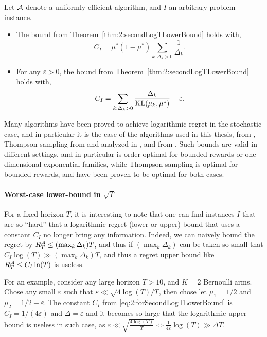 \begin{theorem}\label{thm:2:forSecondLogTLowerBound}
    Let $\mathcal{A}$ denote a uniformly efficient algorithm,
    and $I$ an arbitrary problem instance.
    \begin{itemize}
        \item
        The bound from Theorem~\ref{thm:2:secondLogTLowerBound} holds with,
        \begin{equation}\label{eq:2:forSecondLogTLowerBound}
            C_I = \mu^* (1 - \mu^*) \sum_{k: \Delta_k > 0} \frac{1}{\Delta_k}.
        \end{equation}
        \item
        For any $\varepsilon>0$, the bound from Theorem~\ref{thm:2:secondLogTLowerBound} holds with,
        \begin{equation}\label{eq:2:forSecondLogTLowerBound2}
            C_I = \sum_{k: \Delta_k > 0} \frac{\Delta_k}{\mathrm{KL}(\mu_k, \mu^*)} - \varepsilon.
        \end{equation}
    \end{itemize}
\end{theorem}


Many algorithms have been proved to achieve logarithmic regret in the stochastic case,
and in particular it is the case of the algorithms used in this thesis, \UCB{} from \cite{Auer02}, Thompson sampling from \cite{Thompson33} and analyzed in \cite{AgrawalGoyal11,Kaufmann12Thompson}, and \klUCB{} from \cite{Garivier11KL,KLUCBJournal}.
%
Such bounds are valid in different settings, and in particular \UCB{} is order-optimal for bounded rewards or one-dimensional exponential families,
while Thompson sampling is optimal for bounded rewards, and \klUCB{} have been proven to be optimal for both cases.


\paragraph{Worst-case lower-bound in $\sqrt{T}$}

For a fixed horizon $T$, it is interesting to note that one can find instances $I$ that are so ``hard'' that a logarithmic regret (lower or upper) bound that uses a constant $C_I$ no longer bring any information.
Indeed, we can naively bound the regret by $R_T^{\mathcal{A}} \leq (\max_k \Delta_k) T$, and thus if $(\max_k \Delta_k)$ can be taken so small that $C_I \log(T) \gg (\max_k \Delta_k) T$, and thus a regret upper bound like $R_T^{\mathcal{A}} \leq C_I \ln(T)$ is useless.

For an example, consider any large horizon $T>10$, and $K=2$ Bernoulli arms.
Chose any small $\varepsilon$ such that $\varepsilon \ll \sqrt{4 \log(T) / T}$, then chose let $\mu_1 = 1/2$ and $\mu_2 = 1/2 - \varepsilon$.
The constant $C_I$ from \eqref{eq:2:forSecondLogTLowerBound} is $C_I = 1 / (4 \varepsilon)$ and $\Delta=\varepsilon$ and it becomes so large that
the logarithmic upper-bound is useless in such case, as
$\varepsilon \ll \sqrt{\frac{4 \log(T)}{T}} \Longleftrightarrow \frac{1}{4\varepsilon} \log(T) \gg \Delta T$.

